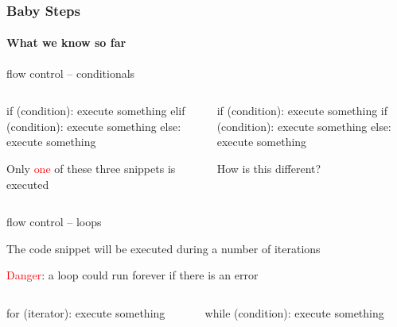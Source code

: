\documentclass{beamer}
\newcommand{\red}[1]{\textcolor{red}{#1}}
\begin{document}
\begin{frame}[fragile]
\frametitle{Baby Steps}
\framesubtitle{What we know so far}

\alert{flow control -- conditionals}

\begin{columns}
\begin{column}{0.4\textwidth}
\begin{python}
if (condition):
	execute something
elif (condition): 
	execute something
else: 
	execute something
\end{python}

Only \red{one} of these three snippets is executed

\end{column}				\pause 

\begin{column}{0.4\textwidth}

\begin{python}
if (condition):
 	execute something
if (condition): 
 	execute something
else: 
 	execute something
\end{python}
\alert{How is this different?}
\bigskip\medskip
\end{column}
\end{columns}			\pause 
\bigskip

\alert{flow control -- loops}

The code snippet will be executed during a number of iterations

\red{Danger}: a loop could run forever if there is an error 

\begin{columns}
\begin{column}{0.4\textwidth}
\begin{python}
for (iterator):
	execute something
\end{python}
\end{column}

\begin{column}{0.4\textwidth}
\begin{python}
while (condition):
	execute something
\end{python}
\end{column}
\end{columns}


\end{frame}
% 
\end{document}
